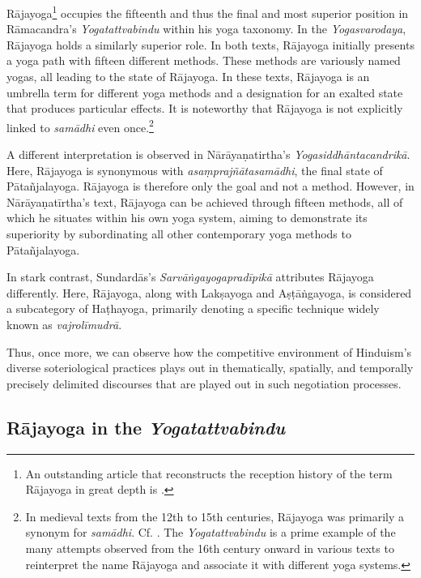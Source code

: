 Rājayoga\footnote{An outstanding article that reconstructs the reception history of the term Rājayoga in great depth is \cite{birch2014}.} occupies the fifteenth and thus the final and most superior position in Rāmacandra's \emph{Yogatattvabindu} within his yoga taxonomy. In the \textit{Yogasvarodaya}, Rājayoga holds a similarly superior role. In both texts, Rājayoga initially presents a yoga path with fifteen different methods. These methods are variously named yogas, all leading to the state of Rājayoga. In these texts, Rājayoga is an umbrella term for different yoga methods and a designation for an exalted state that produces particular effects. It is noteworthy that Rājayoga is not explicitly linked to \textit{samādhi} even once.\footnote{In medieval texts from the 12th to 15th centuries, Rājayoga was primarily a synonym for \textit{samādhi}. Cf. \citeauthor[2014: 401]{birch2014}. The \emph{Yogatattvabindu} is a prime example of the many attempts observed from the 16th century onward in various texts to reinterpret the name Rājayoga and associate it with different yoga systems.}

A different interpretation is observed in Nārāyaṇatirtha's \textit{Yogasiddhāntacandrikā}. Here, Rājayoga is synonymous with \textit{asaṃprajñātasamādhi}, the final state of Pātañjalayoga. Rājayoga is therefore only the goal and not a method. However, in Nārāyaṇatīrtha's text, Rājayoga can be achieved through fifteen methods, all of which he situates within his own yoga system, aiming to demonstrate its superiority by subordinating all other contemporary yoga methods to Pātañjalayoga.

In stark contrast, Sundardās’s \emph{Sarvāṅgayogapradīpikā} attributes Rājayoga differently. Here, Rājayoga, along with Lakṣayoga and Aṣṭāṅgayoga, is considered a subcategory of Haṭhayoga, primarily denoting a specific technique widely known as \textit{vajrolīmudrā}.

Thus, once more, we can observe how the competitive environment of Hinduism’s diverse soteriological practices plays out in thematically, spatially, and temporally precisely delimited discourses that are played out in such negotiation processes. 

\subsection{Rājayoga in the \emph{Yogatattvabindu}}

